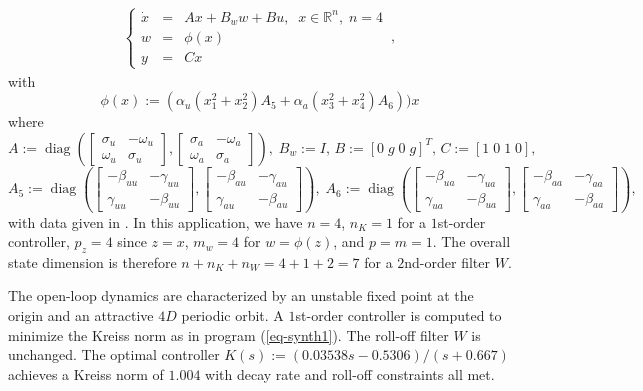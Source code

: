 \documentclass[12pt, a4paper,reqno]{amsart}
\theoremstyle{definition}
\def\diag{\mathop{ \mbox{diag}}\limits}
\begin{document}
\begin{eqnarray}
\label{eq-Brunton2}
\left\{ \begin{array}{lll} \dot x &=& A x  + B_w w + B u,  \;\; x \in \mathbb R^{n}, \; n= 4 \\
w & = & \phi(x)  \\ 
y & = & C x  \end{array}\right. \,,
\end{eqnarray}
with 
$$
\phi(x):= (\alpha_u(x_1^2+x_2^2)A_5 + \alpha_a(x_3^2+x_4^2)A_6))x
$$
where
$$
A:= \diag\left(\begin{bmatrix}\sigma_u &  -\omega_u \\ \omega_u &  \sigma_u \end{bmatrix}, \begin{bmatrix}\sigma_a & -\omega_a \\ \omega_a &  \sigma_a \end{bmatrix}\right), \; B_w := I, \, B:= [0\; g\; 0\; g]^T,\, C:= [1\; 0\; 1\; 0],
$$
$$
A_5:= \diag \left(\begin{bmatrix}-\beta_{uu} &  -\gamma_{uu} \\ \gamma_{uu} &  -\beta_{uu} \end{bmatrix}, \begin{bmatrix}-\beta_{au} &  -\gamma_{au} \\ \gamma_{au} &  -\beta_{au} \end{bmatrix}\right), \;
A_6:= \diag\left(\begin{bmatrix}-\beta_{ua} &  -\gamma_{ua} \\ \gamma_{ua} &  -\beta_{ua} \end{bmatrix}, \begin{bmatrix}-\beta_{aa} &  -\gamma_{aa} \\ \gamma_{aa} &  -\beta_{aa} \end{bmatrix}\right),
$$
with data given in \cite{brunton2015closed}. 
In this application, we have  $n=4$,  $n_K= 1$ for a $1$st-order controller, $p_z = 4$ since $z=x$, $m_w=4$ for $w = \phi(z)$, and $p= m=1$. The overall state  dimension is therefore $n+n_K+n_W = 4 + 1 +2 = 7$ for a $2$nd-order filter $W$.  

The open-loop dynamics are characterized by an unstable fixed point at the origin and an attractive $4D$ periodic orbit. 
A $1$st-order controller is computed to minimize the Kreiss norm as in program (\ref{eq-synth1}). The roll-off filter $W$ is unchanged. 
The optimal controller $K(s):=(0.03538 s - 0.5306)/(s + 0.667)$ achieves a Kreiss norm of $1.004$ with decay rate and roll-off constraints all met.  
\end{document}
